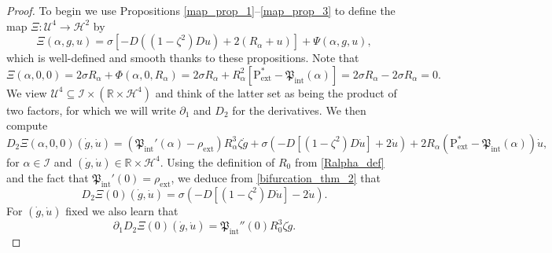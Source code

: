 \documentclass[11pt,reqno]{amsart}
\numberwithin{equation}{section}
\def\p{\partial}
\def\p{\partial}
\newcommand{\m}{\mathrm}
\def\pfint{\mathfrak{P}_{\m{int}}}
\def\pext{\m{P}_{\m{ext}}}
\def\h{\mathcal{H}}
\def\R{\mathbb{R}}
\begin{document}
\begin{proof}
To begin we use Propositions \ref{map_prop_1}--\ref{map_prop_3} to define the map  $\Xi : \mathcal{U}^4 \to \h^2$ by
\begin{equation}\label{def:Xi}
\Xi(\alpha,g,u) = \sigma[ -D((1-\zeta^2) D u) + 2(R_\alpha + u)   ] + \Psi(\alpha,g, u),
\end{equation}
which is well-defined and smooth thanks to these propositions.  Note that 
\begin{equation}\label{bifurcation_thm_1}
 \Xi(\alpha,0,0) = 2\sigma R_\alpha + \Phi(\alpha,0,R_\alpha) = 2 \sigma R_\alpha + R_\alpha^2 [\pext^\ast - \pfint(\alpha)  ] = 2\sigma R_\alpha - 2\sigma R_\alpha = 0.
\end{equation}
We view $\mathcal{U}^4 \subseteq \mathcal{I} \times (\R \times \h^{4})$ and think of the latter set as being the product of two factors, for which we will write $\p_1$ and $D_2$ for the derivatives.  We then compute 
\begin{equation}\label{bifurcation_thm_2}
 D_2\Xi(\alpha,0,0)(\dot{g},\dot{u}) = (\pfint'(\alpha)-\rho_{\m{ext}})R_\alpha^3 \zeta \dot{g}  + \sigma(   -D[(1-\zeta^2) D\dot{u} ]  +2 \dot{u} ) + 2 R_\alpha (\pext^\ast - \pfint(\alpha)) \dot{u},
\end{equation}
for $\alpha \in \mathcal{I}$ and $(\dot{g},\dot{u}) \in \R \times \h^{4}$.  Using the definition of $R_0$ from \eqref{Ralpha_def}  and the fact that $\pfint'(0) = \rho_{\m{ext}}$, we deduce from \eqref{bifurcation_thm_2} that
\begin{equation}\label{bifurcation_thm_3}
 D_2\Xi(0)(\dot{g},\dot{u}) =  \sigma(   -D[(1-\zeta^2) D\dot{u} ]  -2 \dot{u} ).
\end{equation}
For $(\dot{g},\dot{u})$ fixed we also learn that 
\begin{equation}\label{bifurcation_thm_4}
 \partial_1 D_2\Xi(0)(\dot{g},\dot{u}) = \pfint''(0) R_0^3 \zeta \dot{g}.
\end{equation}



\end{proof}
\end{document}
